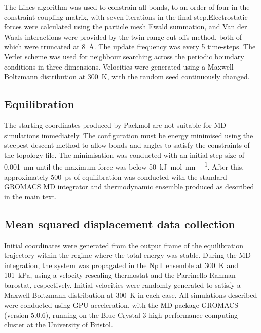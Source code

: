 The Lincs algorithm\cite{hess1997lincs} was used to constrain all bonds, to an order of four in the constraint coupling matrix, with seven iterations in the final step.Electrostatic forces were calculated using the particle mesh Ewald summation\cite{essmannSmoothParticleMesh1995}, and Van der Waals interactions were provided by the twin range cut-offs method, both of which were truncated at \SI{8}{\angstrom}. The update frequency was every \num{5} time-steps. The Verlet scheme\cite{pallFlexibleAlgorithmCalculating2013} was used for neighbour searching across the periodic boundary conditions in three dimensions. Velocities were generated using a Maxwell-Boltzmann distribution at \SI{300}{\kelvin}, with the random seed continuously changed.

\subsection{Equilibration}
 The starting coordinates produced by Packmol\cite{martinez2009packmol} are not suitable for MD simulations immediately. The configuration must be energy minimised using the steepest descent method to allow bonds and angles to satisfy the constraints of the topology file. The minimisation was conducted with an initial step size of \SI{0.001}{\nano\meter} until the maximum force was below \SI{50}{\kilo\joule\per\mole\per\nano\meter}. After this, approximately \SI{500}{\pico\second} of equilibration was conducted with the standard GROMACS MD integrator and thermodynamic ensemble produced as described in the main text. 

\subsection{Mean squared displacement data collection}
Initial coordinates were generated from the output frame of the equilibration trajectory within the regime where the total energy was stable. During the MD integration, the system was propagated in the NpT ensemble at \SI{300}{\kelvin} and \SI{101}{\kilo\pascal}, using a velocity rescaling thermostat\cite{bussiCanonicalSamplingVelocity2007} and the Parrinello-Rahman barostat\cite{parrinelloPolymorphicTransitionsSingle1981}, respectively. Initial velocities were randomly generated to satisfy a Maxwell-Boltzmann distribution at \SI{300}{\kelvin} in each case. All simulations described were conducted using GPU acceleration, with the MD package GROMACS (version 5.0.6)\cite{abrahamGROMACSHighPerformance2015}, running on the Blue Crystal 3 high performance computing cluster at the University of Bristol.

